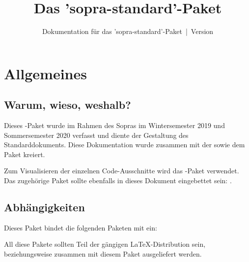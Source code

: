 \documentclass{sopra-base}
\title{Das 'sopra-standard'-Paket}
\subtitle[Dokumentation für das 'sopra-standard'-Paket]{Dokumentation für das 'sopra-standard'-Paket~|~Version \thesosversion}
\begin{document}
    \maketitle%
%
%

%
%
%
%

\section{Allgemeines}
\subsection{Warum, wieso, weshalb?}
    Dieses \LaTeXe-Paket wurde im Rahmen des Sopras im
    Wintersemester 2019 und Sommersemester 2020 verfasst und diente der Gestaltung des Standarddokuments. Diese Dokumentation wurde zusammen mit der
     sowie dem Paket  kreiert.\par
    Zum Visualisieren der einzelnen Code-Ausschnitte wird das
    -Paket verwendet.
    Das zugehörige Paket sollte ebenfalls in dieses Dokument eingebettet sein: .
\subsection{Abhängigkeiten}
    Dieses Paket bindet die folgenden Paketen mit ein:
    \begin{multicols}{4}
    \end{multicols}
    All diese Pakete sollten Teil der gängigen \LaTeX-Distribution sein, beziehungsweise zusammen mit diesem Paket ausgeliefert werden.
\end{document}
